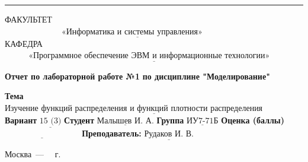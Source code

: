 \documentclass[12pt]{report}
\begin{document}
\begin{titlepage}
		\noindent\rule{18cm}{3pt}
		\newline\newline
		\noindent ФАКУЛЬТЕТ $\underline{~~~~~~~~~~~~~~~~~~~~~~~~~~~~~~~\text{«Информатика и системы управления»}~~~~~~~~~~~~~~~~~~~~~~~~~~~~~~~~~~~~~}$ \newline\newline
		\noindent КАФЕДРА $\underline{~~~~~~~~~~~~~\text{«Программное обеспечение ЭВМ и информационные технологии»}~~~~~~~~~~~~~~~~~~~~~~~}$\newline\newline\newline\newline\newline\newline\newline\newline\newline\newline\newline
		
		
		\begin{center}
			\noindent\begin{minipage}{1.3\textwidth}\centering
				\Large\textbf{  Отчет по лабораторной работе №1}\newline
				\textbf{по дисциплине \newline "Моделирование"}\newline\newline
			\end{minipage}
		\end{center}
		
		\noindent\textbf{Тема} $\underline{\text{Изучение функций распределения и функций плотности распределения случайных чисел}}$\newline\newline
		\noindent\textbf{Вариант} $\underline{\text{15 (3)}}$\newline\newline
		\noindent\textbf{Студент} $\underline{\text{Малышев И. А.}}$\newline\newline
		\noindent\textbf{Группа} $\underline{\text{ИУ7-71Б}}$\newline\newline
		\noindent\textbf{Оценка (баллы)} $\underline{\text{~~~~~~~~~~~~~~~~~~~~~~~~~~~}}$\newline\newline
		\noindent\textbf{Преподаватель: } $\underline{\text{Рудаков И. В.}}$\newline\newline\newline
		
		\begin{center}
			\vfill
			Москва~---~\the\year
			~г.
		\end{center}
	\end{titlepage}
	
\end{document}
